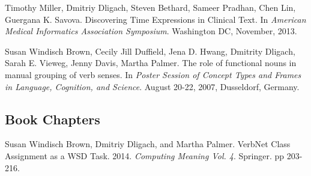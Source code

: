 \documentclass[letterpaper]{article}
\renewenvironment{itemize}{
  \begin{list}{}{
    \setlength{\leftmargin}{1.5em}
  }
}{
  \end{list}
}
\begin{document}
\begin{itemize}
\item Timothy Miller, Dmitriy Dligach, Steven Bethard, Sameer Pradhan, Chen Lin, Guergana K. Savova. Discovering Time Expressions in Clinical Text. In \emph{American Medical Informatics Association Symposium}. Washington DC, November, 2013.
\item Susan Windisch Brown, Cecily Jill Duffield, Jena D. Hwang, Dmitrity Dligach, Sarah E. Vieweg, Jenny Davis, Martha Palmer. The role of functional nouns in manual grouping of verb senses. In \emph {Poster Session of Concept Types and Frames in Language, Cognition, and Science}. August 20-22, 2007, Dusseldorf, Germany.
\end{itemize}

\subsection*{Book Chapters}
\begin{itemize}
\item Susan Windisch Brown, Dmitriy Dligach, and Martha Palmer. VerbNet Class Assignment as a WSD Task. 2014. \emph{Computing Meaning Vol. 4}. Springer. pp 203-216.
\end{itemize}
\end{document}

